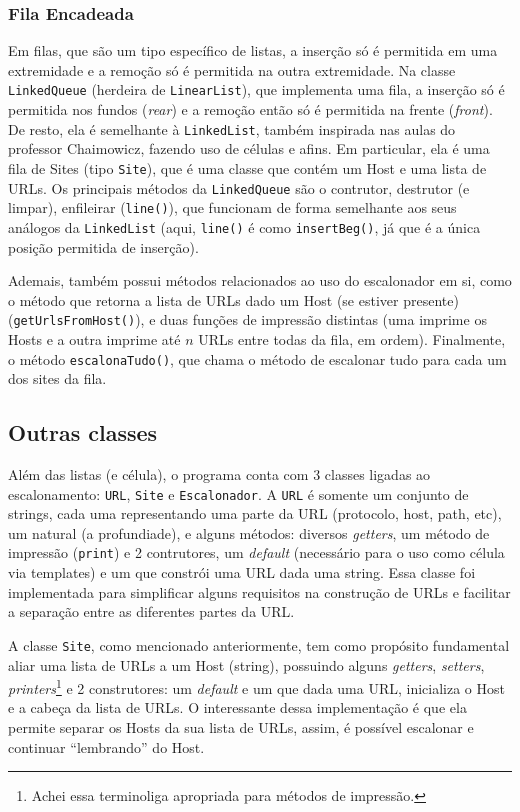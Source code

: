 \documentclass{article}
\def\code#1{\texttt{#1}}
\begin{document}
\subsubsection{Fila Encadeada}

Em filas, que são um tipo específico de listas, a inserção só é permitida em uma extremidade e a remoção só é permitida na outra extremidade. Na classe \code{LinkedQueue} (herdeira de \code{LinearList}), que implementa uma fila, a inserção só é permitida nos fundos (\textit{rear}) e a remoção então só é permitida na frente (\textit{front}). De resto, ela é semelhante à \code{LinkedList}, também inspirada nas aulas do professor Chaimowicz, fazendo uso de células e afins. Em particular, ela é uma fila de Sites (tipo \code{Site}), que é uma classe que contém um Host e uma lista de URLs. Os principais métodos da \code{LinkedQueue} são o contrutor, destrutor (e limpar), enfileirar (\code{line()}), que funcionam de forma semelhante aos seus análogos da \code{LinkedList} (aqui, \code{line()} é como \code{insertBeg()}, já que é a única posição permitida de inserção).

Ademais, também possui métodos relacionados ao uso do escalonador em si, como o método que retorna a lista de URLs dado um Host (se estiver presente) (\code{getUrlsFromHost()}), e duas funções de impressão distintas (uma imprime os Hosts e a outra imprime até \( n \) URLs entre todas da fila, em ordem). Finalmente, o método \code{escalonaTudo()}, que chama o método de escalonar tudo para cada um dos sites da fila.

\subsection{Outras classes}

Além das listas (e célula), o programa conta com 3 classes ligadas ao escalonamento: \code{URL}, \code{Site} e \code{Escalonador}. A \code{URL} é somente um conjunto de strings, cada uma representando uma parte da URL (protocolo, host, path, etc), um natural (a profundiade), e alguns métodos: diversos \textit{getters}, um método de impressão (\code{print}) e 2 contrutores, um \textit{default} (necessário para o uso como célula via templates) e um que constrói uma URL dada uma string. Essa classe foi implementada para simplificar alguns requisitos na construção de URLs e facilitar a separação entre as diferentes partes da URL.

A classe \code{Site}, como mencionado anteriormente, tem como propósito fundamental aliar uma lista de URLs a um Host (string), possuindo alguns \textit{getters}, \textit{setters}, \textit{printers}\footnote{Achei essa terminoliga apropriada para métodos de impressão.} e 2 construtores: um \textit{default} e um que dada uma URL, inicializa o Host e a cabeça da lista de URLs. O interessante dessa implementação é que ela permite separar os Hosts da sua lista de URLs, assim, é possível escalonar e continuar ``lembrando'' do Host.
\end{document}

